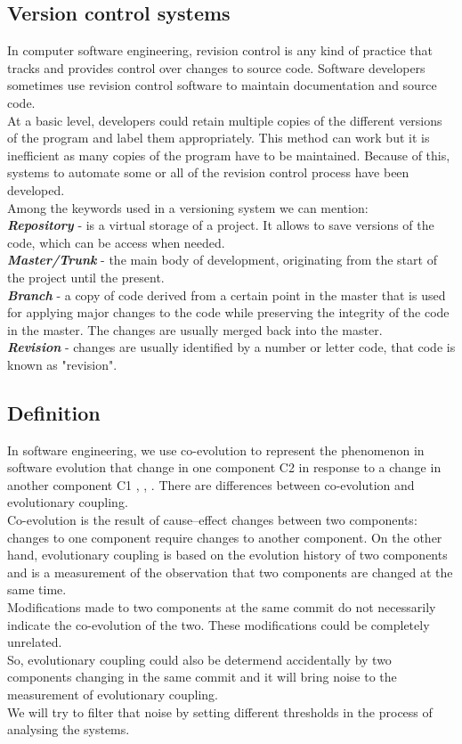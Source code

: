 \subsection{Version control systems}
In computer software engineering, revision control is any kind of practice that tracks and provides control over changes to source code. Software developers sometimes use revision control software to maintain documentation and source code.\\
At a basic level, developers could retain multiple copies of the different versions of the program and label them appropriately. This method can work but it is inefficient as many copies of the program have to be maintained. Because of this, systems to automate some or all of the revision control process have been developed. 
\\ 
\tab Among the keywords used in a versioning system we can mention:\\
\textit{\textbf{Repository}} -  is a virtual storage of a project. It allows to save versions of the code, which can be access when needed.\\
\textit{\textbf{Master/Trunk}} - the main body of development, originating from the start of the project until the present.\\
\textit{\textbf{Branch} }- a copy of code derived from a certain point in the master that is used for applying major changes to the code while preserving the integrity of the code in the master. The changes are usually merged back into the master.\\
\textit{\textbf{Revision}} - changes are usually identified by a number or letter code, that code is known as "revision".\\


\subsection{Definition}

\tab  In software engineering, we use co-evolution to represent the phenomenon in software evolution that change in one component C2 in response to a change in another component C1 \cite{ct5}, \cite{ct6}, \cite{ct8}. 
There are differences between co-evolution and evolutionary coupling.\\ Co-evolution is the result of cause–effect changes between two components: changes to one component require changes to another component. On the other hand, evolutionary coupling is based on the evolution history of two components and is a measurement of the observation that two components are changed at the same time.\\  Modiﬁcations made to two components at the same commit do not necessarily indicate the co-evolution of the two. These modiﬁcations could be completely unrelated.\\ So, evolutionary coupling could also be determend accidentally by two components changing in the same commit and it will bring noise to the measurement of evolutionary coupling.  \cite{ct5} \\ We will try to filter that noise by setting different thresholds in the process of analysing the systems.

